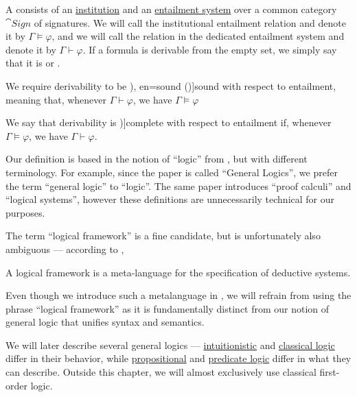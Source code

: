 \begin{definition}\label{def:general_logic}\mimprovised
  A  consists of an \hyperref[def:institution]{institution} and an \hyperref[def:entailment_system]{entailment system} over a common category \( \cat{Sign} \) of signatures. We will call the institutional entailment relation  and denote it by \( \Gamma \vDash \varphi \), and we will call the relation in the dedicated entailment system  and denote it by \( \Gamma \vdash \varphi \). If a formula is derivable from the empty set, we simply say that it is  or .

  We require derivability to be \term[ru=корректное (исличление) (\cite[48]{Герасимов2014Вычислимость}), en=sound (\cite[def. 6]{Meseguer1989GeneralLogics})]{sound} with respect to entailment, meaning that, whenever \( \Gamma \vdash \varphi \), we have \( \Gamma \vDash \varphi \)

  \begin{thmenum}
     We say that derivability is \term[ru=полнота (исличления) (\cite[57]{Герасимов2014Вычислимость})]{complete} with respect to entailment if, whenever \( \Gamma \vDash \varphi \), we have \( \Gamma \vdash \varphi \).
  \end{thmenum}
\end{definition}
\begin{comments}
  \item Our definition is based in the notion of \enquote{logic} from \cite[def. 6]{Meseguer1989GeneralLogics}, but with different terminology. For example, since the paper is called \enquote{General Logics}, we prefer the term \enquote{general logic} to \enquote{logic}. The same paper introduces \enquote{proof calculi} and \enquote{logical systems}, however these definitions are unnecessarily technical for our purposes.

  The term \enquote{logical framework} is a fine candidate, but is unfortunately also ambiguous --- according to \textcite{Pfenning2002LogicalFrameworks},
  \begin{displayquote}
    A logical framework is a meta-language for the specification of deductive systems.
  \end{displayquote}

  Even though we introduce such a metalanguage in , we will refrain from using the phrase \enquote{logical framework} as it is fundamentally distinct from our notion of general logic that unifies syntax and semantics.

  \item We will later describe several general logics --- \hyperref[con:intuitionistic_logic]{intuitionistic} and \hyperref[con:classical_logic]{classical logic} differ in their behavior, while \hyperref[def:propositional_logic]{propositional} and \hyperref[con:predicate_logic]{predicate logic} differ in what they can describe. Outside this chapter, we will almost exclusively use classical first-order logic.
\end{comments}

